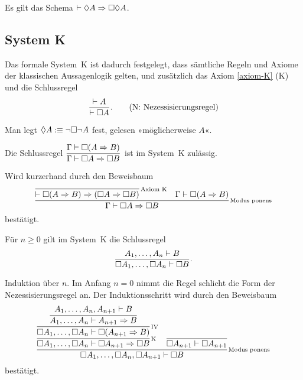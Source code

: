\begin{Axiom}[5]
Es gilt das Schema $\vdash\Diamond A\Rightarrow\Box\Diamond A$.
\end{Axiom}

\subsection{System K}

\begin{Definition}[System K]\newlinefirst
Das formale System~K ist dadurch festgelegt, dass sämtliche Regeln
und Axiome der klassischen Aussagenlogik gelten, und zusätzlich
das Axiom \ref{axiom-K} (K) und die Schlussregel
\[\dfrac{\vdash A}{\vdash\Box A}.\qquad\text{(N: Nezessisierungsregel)}\]
\end{Definition}

\begin{Definition}[Möglichkeit]\label{def:possibly}\newlinefirst
Man legt $\Diamond A :\equiv \neg\Box\neg A$ fest, gelesen
»möglicherweise $A$«.
\end{Definition}

\begin{Satz}[Regel K]
Die Schlussregel $\dfrac{\Gamma\vdash\Box (A\Rightarrow B)}{\Gamma\vdash\Box A\Rightarrow\Box B}$
ist im System~K zulässig. 
\end{Satz}
\begin{Beweis} Wird kurzerhand durch den Beweisbaum
\[
\infer[\infernote{Modus ponens}]{\Gamma\vdash\lnec A\cond\lnec B}{
  \infer[\infernote{Axiom K}]{\vdash\lnec (A\cond B)\cond (\lnec A\cond\lnec B)}{}
& \Gamma\vdash\lnec (A\cond B)}
\]
bestätigt.\,\qedsymbol
\end{Beweis}

\begin{Satz}[Regel N*]
Für $n\ge 0$ gilt im System~K die Schlussregel
\[\dfrac{A_1,\ldots,A_n\vdash B}{\Box A_1,\ldots,\Box A_n\vdash\Box B}.\]
\end{Satz}
\begin{Beweis}
Induktion über $n$. Im Anfang $n=0$ nimmt die Regel schlicht die Form
der Nezessisierungsregel an. Der Induktionsschritt wird durch den Beweisbaum
\[
\infer[\infernote{Modus ponens}]{\lnec A_1,\ldots,\lnec A_n,\lnec A_{n+1}\vdash\lnec B}{
  \infer[\infernote{K}]{\lnec A_1,\ldots,\lnec A_n\vdash\lnec A_{n+1}\cond\lnec B}{
    \infer[\infernote{IV}]{\lnec A_1,\ldots,\lnec A_n\vdash\lnec (A_{n+1}\cond B)}{
      \infer{A_1,\ldots,A_n\vdash A_{n+1}\cond B}{
        A_1,\ldots,A_n,A_{n+1}\vdash B}}}
& \infer{\lnec A_{n+1}\vdash\lnec A_{n+1}}{}}
\]
bestätigt.\,\qedsymbol
\end{Beweis}

